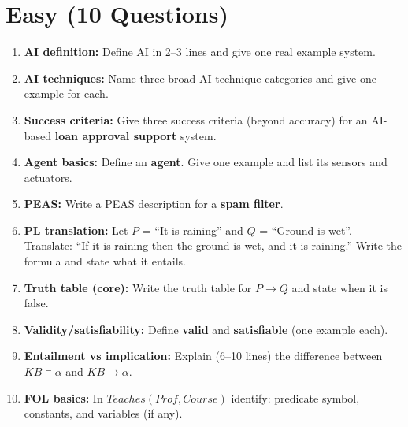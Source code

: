 \documentclass[11pt,a4paper]{article}
\begin{document}
\section*{Easy (10 Questions)}
\begin{enumerate}[label=E\arabic*., leftmargin=*]
  \item \textbf{AI definition:} Define AI in 2--3 lines and give one real example system.

  \item \textbf{AI techniques:} Name three broad AI technique categories and give one example for each.

  \item \textbf{Success criteria:} Give three success criteria (beyond accuracy) for an AI-based \textbf{loan approval support} system.

  \item \textbf{Agent basics:} Define an \textbf{agent}. Give one example and list its sensors and actuators.

  \item \textbf{PEAS:} Write a PEAS description for a \textbf{spam filter}.

  \item \textbf{PL translation:} Let $P$ = ``It is raining'' and $Q$ = ``Ground is wet''.
    Translate: ``If it is raining then the ground is wet, and it is raining.'' Write the formula and state what it entails.

  \item \textbf{Truth table (core):} Write the truth table for $P \rightarrow Q$ and state when it is false.

  \item \textbf{Validity/satisfiability:} Define \textbf{valid} and \textbf{satisfiable} (one example each).

  \item \textbf{Entailment vs implication:} Explain (6--10 lines) the difference between $KB \models \alpha$ and $KB \rightarrow \alpha$.

  \item \textbf{FOL basics:} In $Teaches(Prof, Course)$ identify: predicate symbol, constants, and variables (if any).
\end{enumerate}
\end{document}
